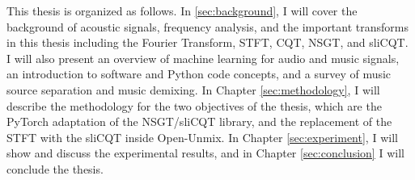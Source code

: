 \documentclass[report.tex]{subfiles}
\begin{document}
This thesis is organized as follows. In  \ref{sec:background}, I will cover the background of acoustic signals, frequency analysis, and the important transforms in this thesis including the Fourier Transform, STFT, CQT, NSGT, and sliCQT. I will also present an overview of machine learning for audio and music signals, an introduction to software and Python code concepts, and a survey of music source separation and music demixing. In Chapter \ref{sec:methodology}, I will describe the methodology for the two objectives of the thesis, which are the PyTorch adaptation of the NSGT/sliCQT library, and the replacement of the STFT with the sliCQT inside Open-Unmix. In Chapter \ref{sec:experiment}, I will show and discuss the experimental results, and in Chapter \ref{sec:conclusion} I will conclude the thesis.
\end{document}
